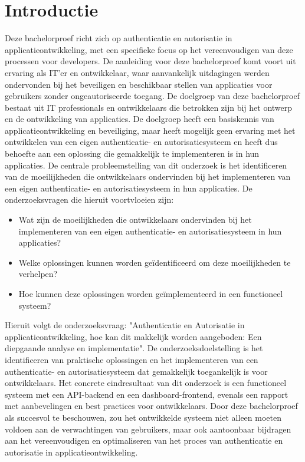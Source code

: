 

\section{Introductie}%
\label{sec:introductie}

Deze bachelorproef richt zich op authenticatie en autorisatie in applicatieontwikkeling, met een specifieke focus op het 
vereenvoudigen van deze processen voor developers. De aanleiding voor deze bachelorproef komt voort uit ervaring als IT'er en ontwikkelaar, 
waar aanvankelijk uitdagingen werden ondervonden bij het beveiligen en beschikbaar stellen van applicaties voor gebruikers zonder ongeautoriseerde toegang.
\newline
\newline
De doelgroep van deze bachelorproef bestaat uit IT professionals en ontwikkelaars die betrokken zijn bij het ontwerp en de ontwikkeling van
applicaties. De doelgroep heeft een basiskennis van applicatieontwikkeling en beveiliging, maar heeft mogelijk geen ervaring met het ontwikkelen
van een eigen authenticatie- en autorisatiesysteem en heeft dus behoefte aan een oplossing die gemakkelijk te implementeren is in hun applicaties.
\newline
\newline
De centrale probleemstelling van dit onderzoek is het identificeren van de moeilijkheden die ontwikkelaars ondervinden bij het implementeren van
een eigen authenticatie- en autorisatiesysteem in hun applicaties. De onderzoeksvragen die hieruit voortvloeien zijn:
\begin{itemize}
  \item Wat zijn de moeilijkheden die ontwikkelaars ondervinden bij het implementeren van een eigen authenticatie- en autorisatiesysteem in hun applicaties?
  \item Welke oplossingen kunnen worden geïdentificeerd om deze moeilijkheden te verhelpen?
  \item Hoe kunnen deze oplossingen worden geïmplementeerd in een functioneel systeem?
\end{itemize}
Hieruit volgt de onderzoeksvraag: "Authenticatie en Autorisatie in applicatieontwikkeling, hoe kan dit makkelijk worden aangeboden: Een diepgaande analyse en implementatie".
\newline
\newline
De onderzoeksdoelstelling is het identificeren van praktische oplossingen en het implementeren van een authenticatie- en autorisatiesysteem 
dat gemakkelijk toegankelijk is voor ontwikkelaars. Het concrete eindresultaat van dit onderzoek is een functioneel systeem met een API-backend 
en een dashboard-frontend, evenals een rapport met aanbevelingen en best practices voor ontwikkelaars.
\newline
\newline
Door deze bachelorproef als succesvol te beschouwen, zou het ontwikkelde systeem niet alleen moeten voldoen aan de verwachtingen van gebruikers, 
maar ook aantoonbaar bijdragen aan het vereenvoudigen en optimaliseren van het proces van authenticatie en autorisatie in applicatieontwikkeling.

